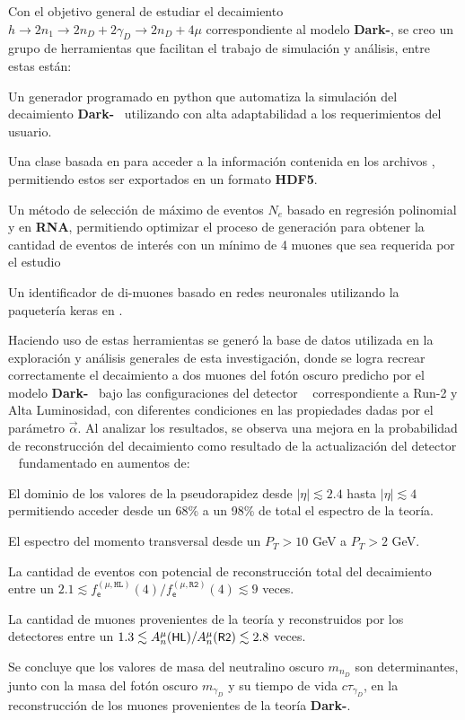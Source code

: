 Con el objetivo general de estudiar el decaimiento $h \rightarrow 2n_1 \rightarrow 2n_D + 2\gamma_D \rightarrow 2n_D + 4\mu$ correspondiente al modelo \textbf{Dark-}\SUSY, se creo un grupo de herramientas que facilitan el trabajo de simulación y análisis, entre estas están:
\begin{itemize_f}
\item Un generador programado en \textsf{python} que automatiza la simulación del decaimiento \textbf{Dark-}\SUSY~ utilizando  con alta adaptabilidad a los requerimientos del usuario.
\item Una clase basada en  para acceder a la información contenida en los archivos , permitiendo estos ser exportados en un formato \textbf{HDF5}.
\item Un método de selección de máximo de eventos $N_e$ basado en regresión polinomial y en \textbf{RNA}, permitiendo optimizar el proceso de generación para obtener la cantidad de eventos de interés con un mínimo de 4 muones que sea requerida por el estudio 
\item Un identificador de di-muones basado en redes neuronales utilizando la paquetería \textsf{keras} en .
\end{itemize_f}
Haciendo uso de estas herramientas se generó la base de datos utilizada en la exploración y análisis generales de esta investigación, donde se logra recrear correctamente el decaimiento a dos muones del fotón oscuro predicho por el modelo \textbf{Dark-}\SUSY~ bajo las configuraciones del detector \CMS ~ correspondiente a Run-2 y Alta Luminosidad, con diferentes condiciones en las propiedades dadas por el parámetro $\vec{\alpha}$. Al analizar los resultados, se observa una mejora en la probabilidad de reconstrucción del decaimiento como resultado de la actualización del detector \CMS~%
fundamentado en aumentos de:
\begin{itemize_f}
\item El dominio de los valores de la pseudorapidez desde $|\eta|\lesssim 2.4$ hasta $|\eta|\lesssim 4$ permitiendo acceder desde un 68\% a un 98\% de total el espectro de la teoría.
\item El espectro del momento transversal desde un $P_T>10$ GeV a $P_T>2$ GeV.
\item La cantidad de eventos con potencial de reconstrucción total del decaimiento entre un $2.1 \lesssim f^{(\mu, \texttt{HL})}_\textsf{e} (4)/f^{(\mu, \texttt{R2})}_\textsf{e} (4) \lesssim 9$ veces.%
\item La cantidad de muones provenientes de la teoría y reconstruidos por los detectores entre un $1.3 \lesssim  A^{\mu}_n(\textsf{\small HL})/A^{\mu}_n(\textsf{\small R2}) \lesssim 2.8$ veces.
\end{itemize_f}
Se concluye que los valores de masa del neutralino oscuro $m_{n_D}$ son determinantes, junto con la masa del fotón oscuro $m_{\gamma_D}$ y su tiempo de vida $c\tau_{\gamma_D}$, en la reconstrucción de los muones provenientes de la teoría \textbf{Dark-}\SUSY.

